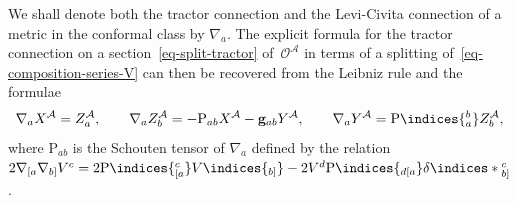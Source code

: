 \documentclass[pdftex]{sigma}
\numberwithin{equation}{section}
\newcommand{\mc} [1]{\mathcal{#1}}
\newcommand{\ind} {\indices}
\newcommand{\Rho} {\mathrm{P}}
\begin{document}
We shall denote both the tractor connection and the Levi-Civita connection of a metric in the conformal class by $\nabla_a$. The explicit formula for the tractor connection on a section~\eqref{eq-split-tractor} of~$\mc{O}^\mc{A}$ in terms of a splitting of~\eqref{eq-composition-series-V} can then be recovered from the Leibniz rule and the formulae
\begin{gather}\label{eq-progXYZ}
\nabla_a X^\mc{A} = Z^\mc{A}_a , \qquad
\nabla_a Z^\mc{A}_b = - \Rho_{ab} X^\mc{A} - \mathbf{g}_{ab} Y^\mc{A} , \qquad
\nabla_a Y^\mc{A} = \Rho \ind{_a^b} Z^\mc{A}_b ,
\end{gather}
where $\Rho_{ab}$ is the Schouten tensor of $\nabla_a$ def\/ined by the relation $2 \nabla_{[a} \nabla_{b]} V^c = 2 \Rho \ind{^c_{[a}} V \ind{_{b]}} - 2 V^d \Rho \ind{_{d[a}} \delta \ind*{_{b]}^c} $.
\end{document}
